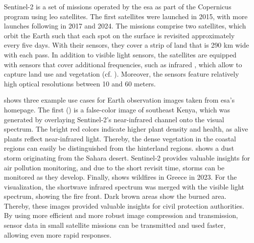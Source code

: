 \documentclass[conference]{IEEEtran}
\newcommand\sentinelii{Sentinel-2\xspace}
\begin{document}
\sentinelii \cite{sentinel2} is a set of missions operated by the \ac{esa} as part of the Copernicus program using \ac{leo} satellites.
The first satellites were launched in 2015, with more launches following in 2017 and 2024.
The missions comprise two satellites, which orbit the Earth such that each spot on the surface is revisited approximately every five days.
With their sensors, they cover a strip of land that is 290 km wide with each pass.
In addition to visible light sensors, the satellites are equipped with sensors that cover additional frequencies, such as infrared \cite{sentinel-2-user-handbook}, which allow to capture land use and vegetation (cf. ).
Moreover, the sensors feature relatively high optical resolutions between 10 and 60 meters.


 shows three example use cases for Earth observation images taken from \ac{esa}'s homepage.
The first () is a false-color image of southeast Kenya, which was generated by overlaying \sentinelii's near-infrared channel onto the visual spectrum.
The bright red colors indicate higher plant density and health, as alive plants reflect near-infrared light.
Thereby, the dense vegetation in the coastal regions can easily be distinguished from the hinterland regions.
 shows a dust storm originating from the Sahara desert.
\sentinelii provides valuable insights for air pollution monitoring, and due to the short revisit time, storms can be monitored as they develop.
Finally,  shows wildfires in Greece in 2023.
For the visualization, the shortwave infrared spectrum was merged with the visible light spectrum, showing the fire front.
Dark brown areas show the burned area.
Thereby, these images provided valuable insights for civil protection authorities.
By using more efficient and more robust image compression and transmission, sensor data in small satellite missions can be transmitted and used faster, allowing even more rapid responses.
\end{document}
